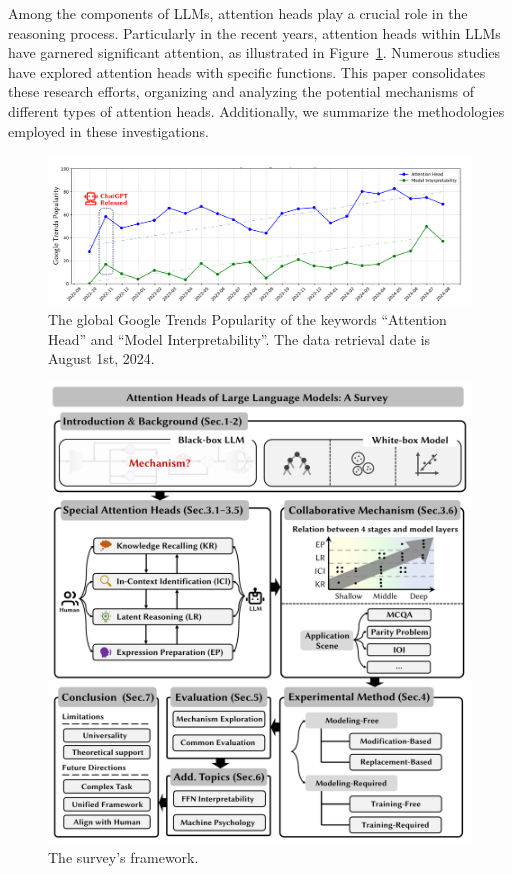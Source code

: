 \documentclass{article}
\begin{document}
Among the components of LLMs, attention heads play a crucial role in the reasoning process. Particularly in the recent years, attention heads within LLMs have garnered significant attention, as illustrated in Figure~\ref{fig:google_trends}. Numerous studies have explored attention heads with specific functions. This paper consolidates these research efforts, organizing and analyzing the potential mechanisms of different types of attention heads. Additionally, we summarize the methodologies employed in these investigations.
\begin{figure}[h!]
    \centering
    \includegraphics[width=\linewidth]{figures/google_trends.pdf}
    \caption{The global Google Trends Popularity of the keywords ``Attention Head'' and ``Model Interpretability''. The data retrieval date is August 1st, 2024.}
    \label{fig:google_trends}
\end{figure}

\begin{figure}[h!]
    \centering
    \includegraphics[width=\linewidth]{figures/framework.pdf}
    \caption{The survey's framework.}
    \label{fig:Overview}
\end{figure}
\end{document}
